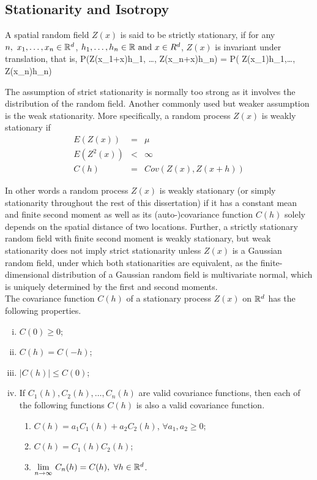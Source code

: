 \subsection{Stationarity and Isotropy}

A spatial random field $Z(x)$ is said to be strictly stationary, if for any $n,\ x_1,\ldots, x_n \in \mathbb{R}^d$, $h_1, \ldots, h_n\in\mathbb{R} \mbox{ and } x\in R^d$, $Z(x)$ is invariant under translation, that is,
\beq
P(Z(x_1+x)\le h_1, \ldots, Z(x_n+x)\le h_n) = P( Z(x_1)\le h_1,\ldots, Z(x_n)\le h_n)
\eeq

The assumption of strict stationarity is normally too strong as it involves the distribution of the random field. Another commonly used but weaker assumption is the weak stationarity. More specifically, a random process $Z(x)$ is weakly stationary if
\begin{eqnarray}
	E(Z(x))   & = & \mu \nonumber \\
	E(Z^2(x)) & < & \infty \nonumber \\
	C(h)      & = & Cov(Z(x),Z(x+h))
\end{eqnarray}

In other words a random process $Z(x)$ is weakly stationary (or simply stationarity throughout the rest of this dissertation) if it has a constant mean and finite second moment as well as its (auto-)covariance function $C(h)$ solely depends on the spatial distance of two locations. Further, a strictly stationary random field with finite second moment is weakly stationary, but weak stationarity does not imply strict stationarity unless $Z(x)$ is a Gaussian random field, under which both stationarities are equivalent, as the finite-dimensional distribution of a Gaussian random field is multivariate normal, which is uniquely determined by the first and second moments. \\

The covariance function $C(h)$ of a stationary process $Z(x)$ on $\mathbb{R}^d$ has the following properties.

\begin{enumerate}[(i)]
	\item $C(0) \ge 0$;
	\item $C(h) = C(-h)$;
	\item $|C(h)| \le  C(0)$;
	\item If $C_1(h), C_2(h), \ldots, C_n(h)$ are valid covariance functions, then each of the following functions $C(h)$ is also a valid covariance function.
	
	      \begin{enumerate}
	      	\item $C(h) = a_1C_1(h)+a_2C_2(h)$, $\forall a_1,a_2\ge 0$;
	      	\item $C(h) = C_1(h)C_2(h)$;
	      	\item $\underset{n\to\infty} {\lim}\ C_n(h)=C(h),\ \forall h\in \R^d$.
	      \end{enumerate}
	
\end{enumerate}

